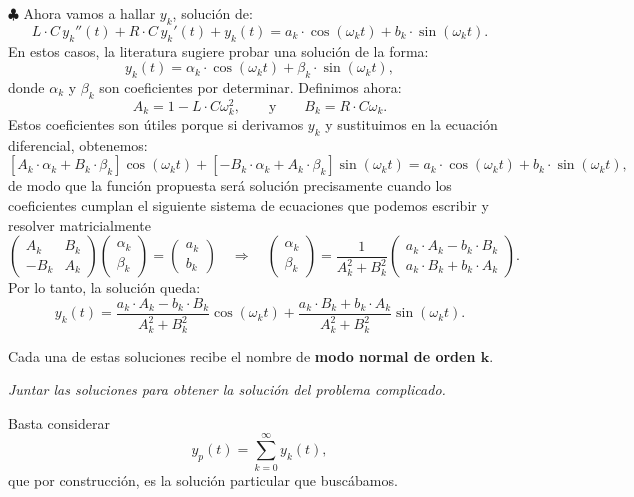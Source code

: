 \begin{enumerate}[{\bfseries [1]}]
 $\clubsuit$ Ahora vamos a hallar $y_{k}$, solución de:
\[
L\cdot C \,y_k '' (t) + R\cdot C\, y_k'(t) + y_k(t) = a_k\cdot \cos(\omega_kt) +  b_k\cdot \sin(\omega_kt) .
\]
En estos casos, la literatura sugiere probar una solución de la forma:
\[
y_{k}(t) = \alpha_k\cdot \cos(\omega_kt) + \beta_k\cdot \sin(\omega_kt),
\]
donde $\alpha_k$ y $\beta_k$ son coeficientes por determinar. Definimos ahora:
\[
A_k = 1- L\cdot C\omega_k^2,\qquad\text{y}\qquad B_k = R\cdot C\omega_k.
\]
Estos coeficientes son útiles porque si derivamos $y_{k}$ y sustituimos en la ecuación diferencial, obtenemos:
\[
 \left[A_k \cdot \alpha_k + B_k\cdot \beta_k\right] \cos(\omega_k t) + \left[-B_k \cdot \alpha_k + A_k\cdot \beta_k\right] \sin(\omega_k t) = a_k\cdot \cos(\omega_kt) +  b_k\cdot \sin(\omega_kt) ,
\]
de modo que la función propuesta será solución precisamente cuando los coeficientes cumplan el siguiente sistema de ecuaciones que podemos escribir y resolver matricialmente
\[
\left(\begin{array}{cc}
A_k  & B_k\\
-B_k & A_k
\end{array}\right)
\left(\begin{array}{c}
 \alpha_k  \\
 \beta_k
\end{array}\right)
=
\left(\begin{array}{c}
 a_k  \\
 b_k
\end{array}\right)
%
\quad \Longrightarrow \quad
%
\left(\begin{array}{c}
 \alpha_k  \\
 \beta_k
\end{array}\right)
=
\frac{1}{A_k^2+B_k^2}
\left(\begin{array}{c}
 a_k\cdot A_k-b_k\cdot B_k \\
 a_k\cdot B_k + b_k\cdot A_k
\end{array}\right).
\] 
Por lo tanto, la solución queda:
\begin{equation}
  \label{eq:ModoNormal}
  \boxed{
    y_k(t) = \frac{a_k\cdot A_k-b_k\cdot B_k}{A_k^2+B_k^2}\cos(\omega_kt) + \frac{a_k\cdot B_k + b_k\cdot A_k}{A_k^2+B_k^2}\sin(\omega_kt).
  }
\end{equation}

Cada una de estas soluciones recibe el nombre de \textbf{modo normal de orden $\mathbf{k}$}.
 
  \item \textit{\color{blue}Juntar las soluciones para obtener la solución del problema complicado.}

Basta considerar
\[\boxed{
y_p (t)= \sum _{k=0}^{\infty} y_k (t),
}\]
que por construcción, es la solución particular que buscábamos.
\end{enumerate}

